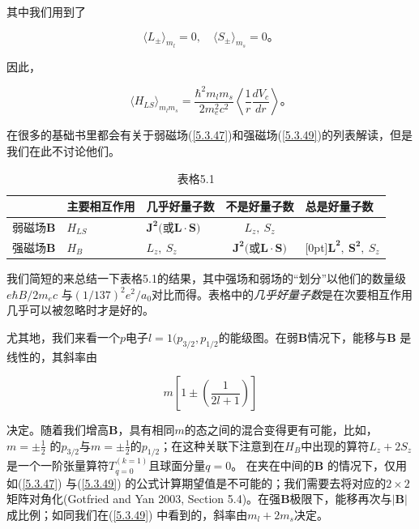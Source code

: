 ﻿\documentclass[UTF8,twoside]{ctexart}
\begin{document}
\noindent 其中我们用到了

\begin{equation} \label{5.3.51}
\langle L_\pm\rangle_{m_l}=0,\quad\langle S_\pm\rangle_{m_s}=0\text{。}
\end{equation}

\noindent 因此，

\begin{equation} \label{5.3.52}
\langle H_{LS}\rangle_{m_lm_s}=\dfrac{\hbar^2m_lm_s}{2m_e^2c^2} \left\langle\dfrac{1}{r}\dfrac{dV_c}{dr}\right\rangle\text{。}
\end{equation}

在很多的基础书里都会有关于弱磁场(\ref{5.3.47})和强磁场(\ref{5.3.49})的列表解读，但是我们在此不讨论他们。

\begin{centering}
\begin{table}[!hbp]
\begin{tabular}{p{1.7cm}p{2.4cm}p{2.4cm}c|p{2.4cm}}
\hline
 & \textbf{主要相互作用}& \textbf{几乎好量子数}& \textbf{不是好量子数} & \textbf{总是好量子数}\\
\hline
弱磁场$\bm B$ & $H_{LS}$ & $\bm{J^2} \text{(或} \bm{L\cdot S}\text{)}$ & $L_z,\ S_z$ \\
强磁场$\bm B$ & $H_B$ & $L_z,\ S_z$ & $\bm{J^2} \text{(或} \bm{L\cdot S}\text{)}$ & \raisebox{2ex}[0pt]{$\bm{L^2,\ S^2},\ S_z$} \\
\hline
\end{tabular}
\caption{表格5.1}
\end{table}
\end{centering}

\noindent 我们简短的来总结一下表格5.1的结果，其中强场和弱场的“划分”以他们的数量级$e\hbar B/2m_ec$ 与$(1/137)^2e^2/a_0$对比而得。表格中的\emph{几乎好量子数}是在次要相互作用几乎可以被忽略时才是好的。

尤其地，我们来看一个$p$电子$l=1(p_{3/2},p_{1/2}$的能级图。在弱$\boldsymbol{B}$情况下，能移与$\boldsymbol{B}$ 是线性的，其斜率由

\begin{equation}
m\left[1\pm\left(\dfrac{1}{2l+1}\right)\right]
\end{equation}

\noindent 决定。随着我们增高$\boldsymbol{B}$，具有相同$m$的态之间的混合变得更有可能，比如，$m=\pm\frac{1}{2}$ 的$p_{3/2}$与$m=\pm\frac{1}{2}$的$p_{1/2}$；在这种关联下注意到在$H_B$中出现的算符$L_z+2S_z$是一个一阶张量算符$T_{q=0}^{(k=1)}$且球面分量$q=0$。 在夹在中间的$\boldsymbol{B}$ 的情况下，仅用如(\ref{5.3.47}) 与(\ref{5.3.49}) 的公式计算期望值是不可能的；我们需要去将对应的$2\times2$ 矩阵对角化(Gotfried and Yan 2003, Section 5.4)。在强$\boldsymbol{B}$极限下，能移再次与$|\boldsymbol{B}|$ 成比例；如同我们在(\ref{5.3.49}) 中看到的，斜率由$m_l+2m_s$决定。
\end{document}
